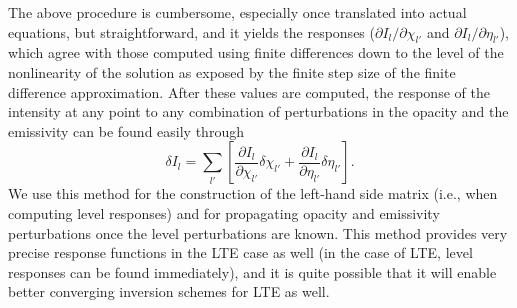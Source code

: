 \documentclass[referee]{aa}
\begin{document}
The above procedure is cumbersome, especially once translated into actual equations, but straightforward, and it yields the responses ($\partial I_{l}/\partial \chi_{l'}$ and $\partial I_{l}/\partial \eta_{l'}$), which agree with those computed using finite differences down to the level of the nonlinearity of the solution as exposed by the finite step size of the finite difference approximation. After these values are computed, the response of the intensity at any point to any combination of perturbations in the opacity and the emissivity can be found easily through
\begin{equation}
 \delta I_l = \sum_{l'} \left [ \frac{\partial I_l}{\partial \chi_{l'}} \delta \chi_{l'} + \frac{\partial I_l}{\partial \eta_{l'}} \delta \eta_{l'} \right ].
\end{equation}
We use this method  for the construction of the left-hand side matrix (i.e., when computing level responses) and for propagating opacity and emissivity perturbations once the level perturbations are known. This method provides very precise response functions in the LTE case as well (in the case of LTE, level responses can be found immediately), and it is quite possible that it will enable better converging inversion schemes for LTE as well.


\end{document}
